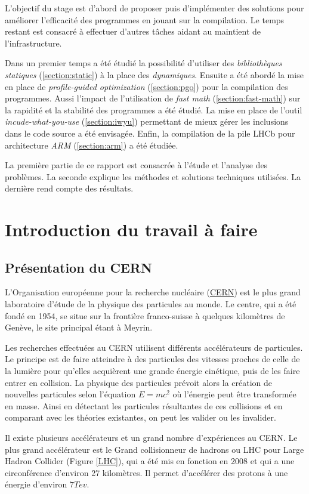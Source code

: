 \documentclass[a4paper,11pt]{report}
\begin{document}
L'objectif du stage est d'abord de proposer puis d'implémenter des solutions pour améliorer l'efficacité des programmes en jouant sur la compilation.
Le temps restant est consacré à effectuer d'autres tâches aidant au maintient de l'infrastructure.

Dans un premier temps a été étudié la possibilité d'utiliser des \emph{bibliothèques statiques} (\ref{section:static}) à la place des \emph{dynamiques}.
Ensuite a été abordé la mise en place de \emph{profile-guided optimization} (\ref{section:pgo}) pour la compilation des programmes.
Aussi l'impact de l'utilisation de \emph{fast math} (\ref{section:fast-math}) sur la rapidité et la stabilité des programmes a été étudié.
La mise en place de l'outil \emph{incude-what-you-use} (\ref{section:iwyu}) permettant de mieux gérer les inclusions dans le code source a été envisagée.
Enfin, la compilation de la pile LHCb pour architecture \emph{ARM} (\ref{section:arm}) a été étudiée.

La première partie de ce rapport est consacrée à l'étude et l'analyse des problèmes.
La seconde explique les méthodes et solutions techniques utilisées.
La dernière rend compte des résultats.


\chapter{Introduction du travail à faire}
\section{Présentation du CERN}
L'Organisation européenne pour la recherche nucléaire (\href{https://home.cern/}{CERN}) est le plus grand laboratoire d'étude de la physique des particules au monde.
Le centre, qui a été fondé en 1954, se situe sur la frontière franco-suisse à quelques kilomètres de Genève, le site principal étant à Meyrin.

Les recherches effectuées au CERN utilisent différents accélérateurs de particules.
Le principe est de faire atteindre à des particules des vitesses proches de celle de la lumière pour qu'elles acquièrent une grande énergie cinétique, puis de les faire entrer en collision.
La physique des particules prévoit alors la création de nouvelles particules selon l'équation $E=mc^2$ où l'énergie peut être transformée en masse.
Ainsi en détectant les particules résultantes de ces collisions et en comparant avec les théories existantes, on peut les valider ou les invalider.

Il existe plusieurs accélérateurs et un grand nombre d'expériences au CERN.
Le plus grand accélérateur est le Grand collisionneur de hadrons ou LHC pour Large Hadron Collider (Figure \ref{LHC}), qui a été mis en fonction en 2008 et qui a une circonférence d'environ 27 kilomètres.
Il permet d'accélérer des protons à une énergie d'environ $7 Tev$.
\end{document}
